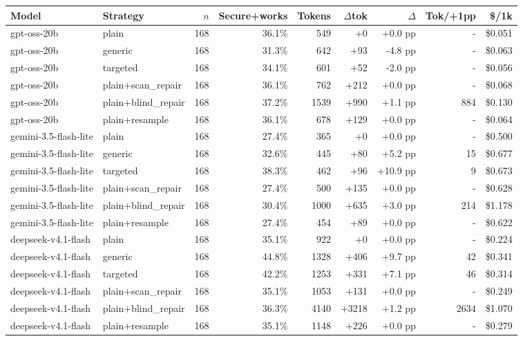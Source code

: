 \begin{tabular}{llrrrrrrr}
\toprule
Model & Strategy & $n$ & Secure+works & Tokens & $\Delta$tok & $\Delta$ & Tok/+1pp & \$/1k \\
\midrule
gpt-oss-20b & plain & 168 & 36.1\% & 549 & +0 & +0.0 pp & - & \$0.051 \\
gpt-oss-20b & generic & 168 & 31.3\% & 642 & +93 & -4.8 pp & - & \$0.063 \\
gpt-oss-20b & targeted & 168 & 34.1\% & 601 & +52 & -2.0 pp & - & \$0.056 \\
gpt-oss-20b & plain+scan\_repair & 168 & 36.1\% & 762 & +212 & +0.0 pp & - & \$0.068 \\
gpt-oss-20b & plain+blind\_repair & 168 & 37.2\% & 1539 & +990 & +1.1 pp & 884 & \$0.130 \\
gpt-oss-20b & plain+resample & 168 & 36.1\% & 678 & +129 & +0.0 pp & - & \$0.064 \\
gemini-3.5-flash-lite & plain & 168 & 27.4\% & 365 & +0 & +0.0 pp & - & \$0.500 \\
gemini-3.5-flash-lite & generic & 168 & 32.6\% & 445 & +80 & +5.2 pp & 15 & \$0.677 \\
gemini-3.5-flash-lite & targeted & 168 & 38.3\% & 462 & +96 & +10.9 pp & 9 & \$0.673 \\
gemini-3.5-flash-lite & plain+scan\_repair & 168 & 27.4\% & 500 & +135 & +0.0 pp & - & \$0.628 \\
gemini-3.5-flash-lite & plain+blind\_repair & 168 & 30.4\% & 1000 & +635 & +3.0 pp & 214 & \$1.178 \\
gemini-3.5-flash-lite & plain+resample & 168 & 27.4\% & 454 & +89 & +0.0 pp & - & \$0.622 \\
deepseek-v4.1-flash & plain & 168 & 35.1\% & 922 & +0 & +0.0 pp & - & \$0.224 \\
deepseek-v4.1-flash & generic & 168 & 44.8\% & 1328 & +406 & +9.7 pp & 42 & \$0.341 \\
deepseek-v4.1-flash & targeted & 168 & 42.2\% & 1253 & +331 & +7.1 pp & 46 & \$0.314 \\
deepseek-v4.1-flash & plain+scan\_repair & 168 & 35.1\% & 1053 & +131 & +0.0 pp & - & \$0.249 \\
deepseek-v4.1-flash & plain+blind\_repair & 168 & 36.3\% & 4140 & +3218 & +1.2 pp & 2634 & \$1.070 \\
deepseek-v4.1-flash & plain+resample & 168 & 35.1\% & 1148 & +226 & +0.0 pp & - & \$0.279 \\
\bottomrule
\end{tabular}
